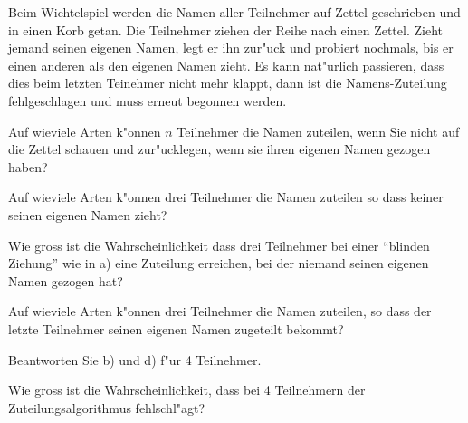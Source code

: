 Beim Wichtelspiel werden die Namen aller Teilnehmer auf Zettel geschrieben
und in einen Korb getan.
Die Teilnehmer ziehen der Reihe nach einen Zettel.
Zieht jemand seinen eigenen Namen, legt er ihn zur"uck und probiert
nochmals, bis er einen anderen als den eigenen Namen zieht.
Es kann nat"urlich passieren, dass dies beim letzten Teinehmer
nicht mehr klappt, dann ist die Namens-Zuteilung fehlgeschlagen und
muss erneut begonnen werden.

\begin{teilaufgaben}
\item Auf wieviele Arten k"onnen $n$ Teilnehmer die Namen zuteilen,
wenn Sie nicht auf die Zettel schauen und zur"ucklegen, wenn sie ihren
eigenen Namen gezogen haben?
\item Auf wieviele Arten k"onnen drei Teilnehmer die Namen zuteilen
so dass keiner seinen eigenen Namen zieht?
\item Wie gross ist die Wahrscheinlichkeit dass drei Teilnehmer
bei einer ``blinden Ziehung'' wie in a) eine Zuteilung erreichen, bei
der niemand seinen eigenen Namen gezogen hat?
\item Auf wieviele Arten k"onnen drei Teilnehmer die Namen zuteilen,
so dass der letzte Teilnehmer seinen eigenen Namen zugeteilt bekommt?
\item Beantworten Sie b) und d) f"ur 4 Teilnehmer.
\item Wie gross ist die Wahrscheinlichkeit, dass bei 4 Teilnehmern
der Zuteilungsalgorithmus fehlschl"agt?
\end{teilaufgaben}

